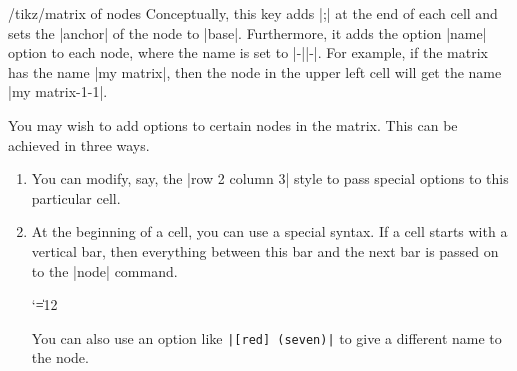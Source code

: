 \begin{key}{/tikz/matrix of nodes}
    Conceptually, this key adds |;| at the end
    of each cell and sets the |anchor| of the node to |base|. Furthermore, it
    adds the option |name| option to each node, where the name is set to
    |-||-|. For
    example, if the matrix has the name |my matrix|, then the node in  the
    upper left cell will get the name |my matrix-1-1|.
\begin{codeexample}[preamble={\usetikzlibrary{matrix}}]
\end{codeexample}

    You may wish to add options to certain nodes in the matrix. This can be
    achieved in three ways.
    \begin{enumerate}
        \item You can modify, say, the |row 2 column 3| style to pass special
            options to this particular cell.
\begin{codeexample}[preamble={\usetikzlibrary{matrix}}]
\end{codeexample}
        \item At the beginning of a cell, you can use a special syntax. If a
            cell starts with a vertical bar, then everything between this bar
            and the next bar is passed on to the |node| command.
{\catcode`\|=12
\begin{codeexample}[preamble={\usetikzlibrary{matrix}}]
\end{codeexample}
}
            You can also use an option like \verb!|[red] (seven)|! to give a
            different name to the node.


\end{enumerate}
\end{key}
